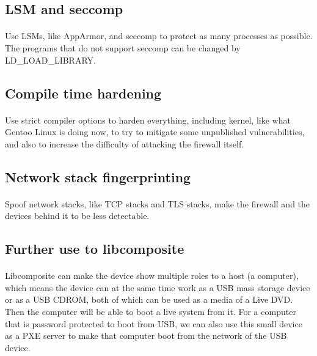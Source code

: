 \documentclass[mscthesis]{usiinfthesis}
\begin{document}
\subsection{LSM and seccomp}
\paragraph{}
Use LSMs, like AppArmor, and seccomp to protect as many processes as possible. The programs that do not support seccomp can be changed by LD\_LOAD\_LIBRARY.

\subsection{Compile time hardening}
\paragraph{}
Use strict compiler options to harden everything, including kernel, like what Gentoo Linux is doing now, to try to mitigate some unpublished vulnerabilities, and also to increase the difficulty of attacking the firewall itself.

\subsection{Network stack fingerprinting}
\paragraph{}
Spoof network stacks, like TCP stacks and TLS stacks, make the firewall and the devices behind it to be less detectable.

\subsection{Further use to libcomposite}
\paragraph{}
Libcomposite can make the device show multiple roles to a host (a computer), which means the device can at the same time work as a USB mass storage device or as a USB CDROM, both of which can be used as a media of a Live DVD. Then the computer will be able to boot a live system from it. For a computer that is password protected to boot from USB, we can also use this small device as a PXE server to make that computer boot from the network of the USB device.
\end{document}
